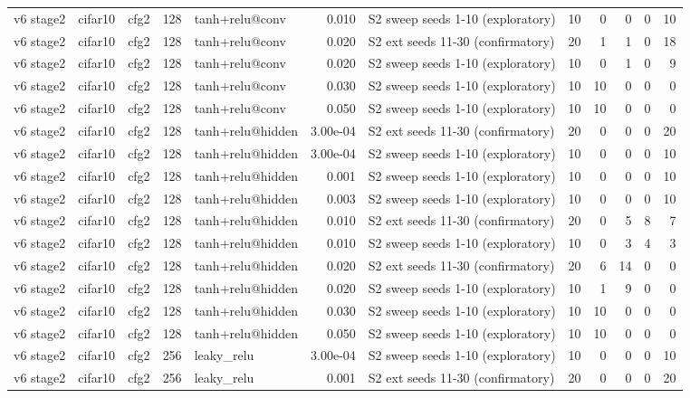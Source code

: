 \begin{table}[htbp]
{\begin{tabular}{@{}lllrlrlrrrrr@{}}
v6 stage2 & cifar10 & cfg2 & 128 & tanh+relu@conv & 0.010 & S2 sweep seeds 1-10 (exploratory) & 10 & 0 & 0 & 0 & 10 \\
v6 stage2 & cifar10 & cfg2 & 128 & tanh+relu@conv & 0.020 & S2 ext seeds 11-30 (confirmatory) & 20 & 1 & 1 & 0 & 18 \\
v6 stage2 & cifar10 & cfg2 & 128 & tanh+relu@conv & 0.020 & S2 sweep seeds 1-10 (exploratory) & 10 & 0 & 1 & 0 & 9 \\
v6 stage2 & cifar10 & cfg2 & 128 & tanh+relu@conv & 0.030 & S2 sweep seeds 1-10 (exploratory) & 10 & 10 & 0 & 0 & 0 \\
v6 stage2 & cifar10 & cfg2 & 128 & tanh+relu@conv & 0.050 & S2 sweep seeds 1-10 (exploratory) & 10 & 10 & 0 & 0 & 0 \\
v6 stage2 & cifar10 & cfg2 & 128 & tanh+relu@hidden & 3.00e-04 & S2 ext seeds 11-30 (confirmatory) & 20 & 0 & 0 & 0 & 20 \\
v6 stage2 & cifar10 & cfg2 & 128 & tanh+relu@hidden & 3.00e-04 & S2 sweep seeds 1-10 (exploratory) & 10 & 0 & 0 & 0 & 10 \\
v6 stage2 & cifar10 & cfg2 & 128 & tanh+relu@hidden & 0.001 & S2 sweep seeds 1-10 (exploratory) & 10 & 0 & 0 & 0 & 10 \\
v6 stage2 & cifar10 & cfg2 & 128 & tanh+relu@hidden & 0.003 & S2 sweep seeds 1-10 (exploratory) & 10 & 0 & 0 & 0 & 10 \\
v6 stage2 & cifar10 & cfg2 & 128 & tanh+relu@hidden & 0.010 & S2 ext seeds 11-30 (confirmatory) & 20 & 0 & 5 & 8 & 7 \\
v6 stage2 & cifar10 & cfg2 & 128 & tanh+relu@hidden & 0.010 & S2 sweep seeds 1-10 (exploratory) & 10 & 0 & 3 & 4 & 3 \\
v6 stage2 & cifar10 & cfg2 & 128 & tanh+relu@hidden & 0.020 & S2 ext seeds 11-30 (confirmatory) & 20 & 6 & 14 & 0 & 0 \\
v6 stage2 & cifar10 & cfg2 & 128 & tanh+relu@hidden & 0.020 & S2 sweep seeds 1-10 (exploratory) & 10 & 1 & 9 & 0 & 0 \\
v6 stage2 & cifar10 & cfg2 & 128 & tanh+relu@hidden & 0.030 & S2 sweep seeds 1-10 (exploratory) & 10 & 10 & 0 & 0 & 0 \\
v6 stage2 & cifar10 & cfg2 & 128 & tanh+relu@hidden & 0.050 & S2 sweep seeds 1-10 (exploratory) & 10 & 10 & 0 & 0 & 0 \\
v6 stage2 & cifar10 & cfg2 & 256 & leaky\_relu & 3.00e-04 & S2 sweep seeds 1-10 (exploratory) & 10 & 0 & 0 & 0 & 10 \\
v6 stage2 & cifar10 & cfg2 & 256 & leaky\_relu & 0.001 & S2 ext seeds 11-30 (confirmatory) & 20 & 0 & 0 & 0 & 20 \\

\end{tabular}}
\end{table}
